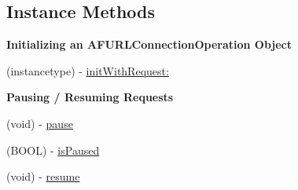 \subsection*{Instance Methods}
\begin{Indent}{\bf Initializing an A\+F\+U\+R\+L\+Connection\+Operation Object}\par
{\em 

 

 }\begin{DoxyCompactItemize}
\item 
(instancetype) -\/ \hyperlink{interface_a_f_u_r_l_connection_operation_aa9923ab9910d684883ff1098b0db9e35}{init\+With\+Request\+:}
\end{DoxyCompactItemize}
\end{Indent}
\begin{Indent}{\bf Pausing / Resuming Requests}\par
{\em 

 

 }\begin{DoxyCompactItemize}
\item 
(void) -\/ \hyperlink{interface_a_f_u_r_l_connection_operation_a7f895d00bdf837f67b959a3bf1bc37a2}{pause}
\item 
(B\+O\+O\+L) -\/ \hyperlink{interface_a_f_u_r_l_connection_operation_a7fbb0a649a549bf21234c02c556c61f9}{is\+Paused}
\item 
(void) -\/ \hyperlink{interface_a_f_u_r_l_connection_operation_ae67c1478ba17af4426ca7152251da473}{resume}
\end{DoxyCompactItemize}
\end{Indent}
